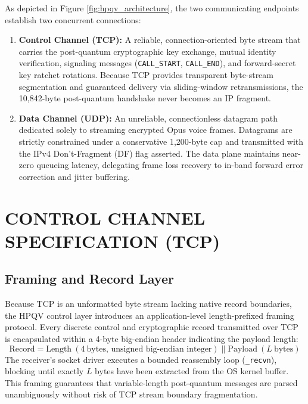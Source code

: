 As depicted in Figure \ref{fig:hpqv_architecture}, the two communicating endpoints establish two concurrent connections:
\begin{enumerate}
    \item \textbf{Control Channel (TCP):} A reliable, connection-oriented byte stream that carries the post-quantum cryptographic key exchange, mutual identity verification, signaling messages (\texttt{CALL\_START}, \texttt{CALL\_END}), and forward-secret key ratchet rotations. Because TCP provides transparent byte-stream segmentation and guaranteed delivery via sliding-window retransmissions, the 10,842-byte post-quantum handshake never becomes an IP fragment.
    \item \textbf{Data Channel (UDP):} An unreliable, connectionless datagram path dedicated solely to streaming encrypted Opus voice frames. Datagrams are strictly constrained under a conservative 1,200-byte cap and transmitted with the IPv4 Don't-Fragment (DF) flag asserted. The data plane maintains near-zero queueing latency, delegating frame loss recovery to in-band forward error correction and jitter buffering.
\end{enumerate}

\section{CONTROL CHANNEL SPECIFICATION (TCP)}

\subsection{Framing and Record Layer}
Because TCP is an unformatted byte stream lacking native record boundaries, the HPQV control layer introduces an application-level length-prefixed framing protocol. Every discrete control and cryptographic record transmitted over TCP is encapsulated within a 4-byte big-endian header indicating the payload length:
\begin{equation}
    \text{Record} = \text{Length}\ (4\ \text{bytes, unsigned big-endian integer}) \parallel \text{Payload}\ (L\ \text{bytes})
\end{equation}
The receiver's socket driver executes a bounded reassembly loop (\texttt{\_recvn}), blocking until exactly $L$ bytes have been extracted from the OS kernel buffer. This framing guarantees that variable-length post-quantum messages are parsed unambiguously without risk of TCP stream boundary fragmentation.

